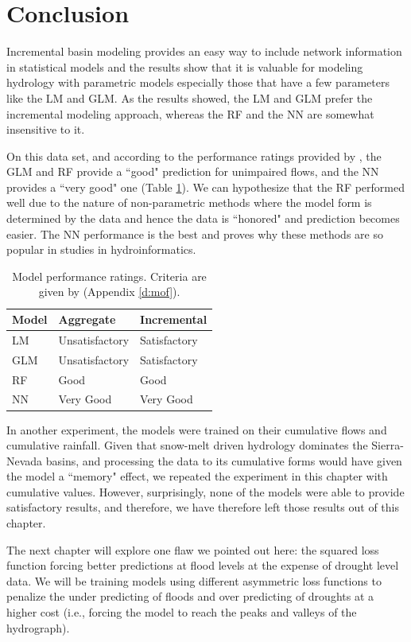 \section{Conclusion}
Incremental basin modeling provides an easy way to include network information in statistical models and the results show that it is valuable for modeling hydrology with parametric models especially those that have a few parameters like the LM and GLM. As the results showed, the LM and GLM prefer the incremental modeling approach, whereas the RF and the NN are somewhat insensitive to it. 

On this data set, and according to the performance ratings provided by , the GLM and RF provide a ``good" prediction for unimpaired flows, and the NN provides a ``very good" one (Table \ref{table:modelperformance}). We can hypothesize that the RF performed well due to the nature of non-parametric methods where the model form is determined by the data and hence the data is ``honored" and prediction becomes easier. The NN performance is the best and proves why these methods are so popular in studies in hydroinformatics. 

\begin{table}[h]\renewcommand{\arraystretch}{1} 
	\linespread{1.0}
	\centering
	\caption{Model performance ratings. Criteria are given by \protect{} (Appendix \ref{d:mof}).}
	\begin{tabular}{p{5cm}p{5cm}p{5cm}} %
		\toprule
		Model & Aggregate & Incremental  \\
		\midrule
		LM & Unsatisfactory & Satisfactory \\
		\addlinespace
		GLM & Unsatisfactory & Satisfactory \\
		\addlinespace
		RF & Good & Good \\
		\addlinespace
		NN & Very Good & Very Good \\
		\bottomrule
	\end{tabular}
	\label{table:modelperformance}
\end{table}

In another experiment, the models were trained on their cumulative flows and cumulative rainfall. Given that snow-melt driven hydrology dominates the Sierra-Nevada basins, and processing the data to its cumulative forms would have given the model a ``memory" effect, we repeated the experiment in this chapter with cumulative values. However, surprisingly, none of the models were able to provide satisfactory results, and therefore, we have therefore left those results out of this chapter. 

The next chapter will explore one flaw we pointed out here: the squared loss function forcing better predictions at flood levels at the expense of drought level data. We will be training models using different asymmetric loss functions to penalize the under predicting of floods and over predicting of droughts at a higher cost (i.e., forcing the model to reach the peaks and valleys of the hydrograph). 

